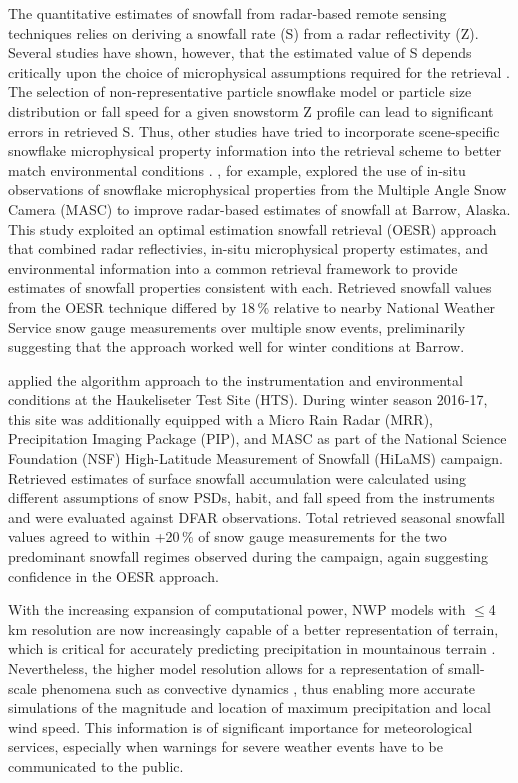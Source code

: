 \documentclass{ametsocV5}
\begin{document}
    The quantitative estimates of snowfall from radar-based remote sensing techniques relies on deriving a snowfall rate (S) from a radar reflectivity (Z). Several studies have shown, however, that the estimated value of S depends critically upon the choice of microphysical assumptions required for the retrieval \citep{kulie_utilizing_2009,friedrich_quantifying_2020}. The selection of non-representative particle snowflake model or particle size distribution or fall speed for a given snowstorm Z profile can lead to significant errors in retrieved S. Thus, other studies have tried to incorporate scene-specific snowflake microphysical property information into the retrieval scheme to better match environmental conditions \citep{wood_microphysical_2015}. \citet{cooper_variational_2017}, for example, explored the use of in-situ observations of snowflake microphysical properties from the Multiple Angle Snow Camera (MASC) to improve radar-based estimates of snowfall at Barrow, Alaska. This study exploited an optimal estimation snowfall retrieval (OESR) approach that combined radar reflectivies, in-situ microphysical property estimates, and environmental information into a common retrieval framework to provide estimates of snowfall properties consistent with each. Retrieved snowfall values from the \citet{cooper_variational_2017} OESR technique differed by 18\,\% relative to nearby National Weather Service snow gauge measurements over multiple snow events, preliminarily suggesting that the approach worked well for winter conditions at Barrow.

    \citet{schirle_estimation_2019} applied the \citet{cooper_variational_2017} algorithm approach to the instrumentation and environmental conditions at the Haukeliseter Test Site (HTS). During winter season 2016-17, this site was additionally equipped with a Micro Rain Radar (MRR), Precipitation Imaging Package (PIP), and MASC as part of the National Science Foundation (NSF) High-Latitude Measurement of Snowfall (HiLaMS) campaign. Retrieved estimates of surface snowfall accumulation were calculated using different assumptions of snow PSDs, habit, and fall speed from the instruments and were evaluated against DFAR observations. Total retrieved seasonal snowfall values agreed to within +20\,\% of snow gauge measurements for the two predominant snowfall regimes observed during the campaign, again suggesting confidence in the OESR approach. 
    
    With the increasing expansion of computational power, NWP models with $\leq$4\,km resolution are now increasingly capable of a better representation of terrain, which is critical for accurately predicting precipitation in mountainous terrain \citep{colle_59_2000, colle_1314_2005, garvert_1314_2005, schwartz_reproducing_2014}. Nevertheless, the higher model resolution allows for a representation of small-scale phenomena such as convective dynamics \citep{gowan_validation_2018}, thus enabling more accurate simulations of the magnitude and location of maximum precipitation and local wind speed. This information is of significant importance for meteorological services, especially when warnings for severe weather events have to be communicated to the public.
    
\end{document}
